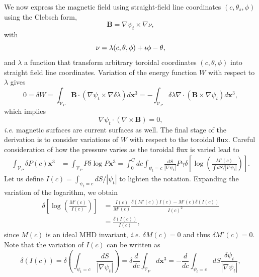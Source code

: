 \documentclass[my_thesis.tex]{subfiles}
\begin{document}
We now express the magnetic field using straight-field line coordinates $(c,\theta_s,\phi)$ \citep{Helander2014} using the Clebsch form,
\begin{equation}
	\mathbf{B} = \nabla\psi_t\times\nabla\nu,
\end{equation}
with
\begin{equation}
	\nu = \lambda(c,\theta,\phi) + \text{$\iota\!\!$-}\phi - \theta,
\end{equation}
and $\lambda$ a function that transform arbitrary toroidal coordinates $(c,\theta,\phi)$ into straight field line coordinates. Variation of the energy function $W$ with respect to $\lambda$ gives
\begin{equation}
	0=\delta W = \int_{\mathcal{V}_P}\mathbf{B}\cdot(\nabla\psi_t\times\nabla\delta\lambda)d\mathbf{x}^3=-\int_{\mathcal{V}_P} \delta\lambda\nabla\cdot(\mathbf{B}\times\nabla\psi_t)d\mathbf{x}^3,
\end{equation}
which implies
\begin{equation}
	\nabla\psi_t\cdot(\nabla\times\mathbf{B})=0,
\end{equation}
\textit{i.e.} magnetic surfaces are current surfaces as well. The final stage of the derivation is to consider variations of $W$ with respect to the toroidal flux. Careful consideration of how the pressure varies as the toroidal flux is varied lead to
\begin{align}
	\int_{\mathcal{V}_P} \delta P(c) \mathbf{x}^3 &= \int_{\mathcal{V}_P}P  \delta \log P\mathbf{x}^3 = \int_0^C dc \int_{\psi_t=c} \frac{dS}{|\nabla\psi_t|} P \gamma \delta\left[\log \left(\frac{M'(c)}{\int dS/|\nabla\psi_t|}\right)\right].
\end{align}
Let us define $I(c)=\int_{\psi_t=c}dS/|\psi_t|$ to lighten the notation. Expanding the variation of the logarithm, we obtain
\begin{align}
	\delta\left[\log\left(\frac{M'(c)}{I(c)}\right)\right] &= \frac{I(c)}{M'(c)} \frac{\delta(M'(c))I(c) - M'(c)\delta(I(c))}{I(c)^2} \\
	&= \frac{\delta(I(c))}{I(c)},
\end{align}
since $M(c)$ is an ideal MHD invariant, \textit{i.e.} $\delta M(c)=0$ and thus $\delta M'(c)=0$. Note that the variation of $I(c)$ can be written as
\begin{equation}
	\delta(I(c)) = \delta\left(\int_{\psi_t=c}\frac{dS}{|\nabla\psi_t|}\right) = \delta \frac{d}{dc}\int_{\mathcal{V}_P}d\mathbf{x}^3 = -\frac{d}{dc}\int_{\psi_t=c}dS\frac{\delta\psi_t}{|\nabla\psi_t|},
\end{equation}
\end{document}

